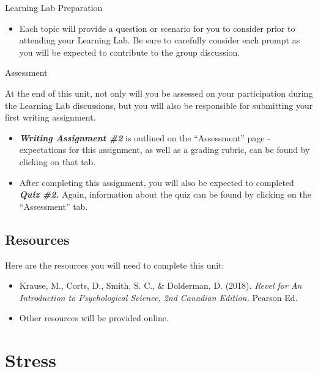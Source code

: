 \documentclass[
]{book}
\providecommand{\tightlist}{%
  \setlength{\itemsep}{0pt}\setlength{\parskip}{0pt}}
\begin{document}
\begin{reflect}
{Learning Lab Preparation}

\begin{itemize}
\tightlist
\item
  Each topic will provide a question or scenario for you to consider prior to attending your Learning Lab. Be sure to carefully consider each prompt as you will be expected to contribute to the group discussion.
\end{itemize}

{Assessment}

At the end of this unit, not only will you be assessed on your participation during the Learning Lab discussions, but you will also be responsible for submitting your first writing assignment.

\begin{itemize}
\item
  \textbf{\emph{Writing Assignment \#2}} is outlined on the ``Assessment'' page - expectations for this assignment, as well as a grading rubric, can be found by clicking on that tab.
\item
  After completing this assignment, you will also be expected to completed \textbf{\emph{Quiz \#2.}} Again, information about the quiz can be found by clicking on the ``Assessment'' tab.
\end{itemize}
\end{reflect}

\hypertarget{resources-9}{%
\subsection*{Resources}\label{resources-9}}

Here are the resources you will need to complete this unit:

\begin{itemize}
\tightlist
\item
  Krause, M., Corts, D., Smith, S. C., \& Dolderman, D. (2018). \emph{Revel for An Introduction to Psychological Science, 2nd Canadian Edition.} Pearson Ed.\\
\item
  Other resources will be provided online.
\end{itemize}

\hypertarget{stress}{%
\section{Stress}\label{stress}}
\end{document}
